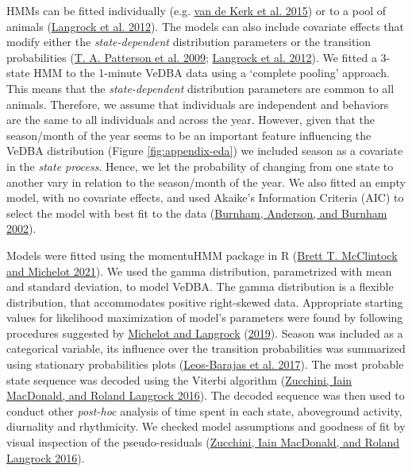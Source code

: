 \documentclass[english,msc,numbers,hidelinks]{coppe}
\begin{document}
  HMMs can be fitted individually (e.g. \protect\hyperlink{ref-vandekerk2015}{van de Kerk et al. 2015}) or to a pool of animals (\protect\hyperlink{ref-langrock2012}{Langrock et al. 2012}). The models can also include covariate effects that modify either the \emph{state-dependent} distribution parameters or the transition probabilities (\protect\hyperlink{ref-patterson2009}{T. A. Patterson et al. 2009}; \protect\hyperlink{ref-langrock2012}{Langrock et al. 2012}). We fitted a 3-state HMM to the 1-minute VeDBA data using a `complete pooling' approach. This means that the \emph{state-dependent} distribution parameters are common to all animals. Therefore, we assume that individuals are independent and behaviors are the same to all individuals and across the year. However, given that the season/month of the year seems to be an important feature influencing the VeDBA distribution (Figure \ref{fig:appendix-eda}) we included season as a covariate in the \emph{state process}. Hence, we let the probability of changing from one state to another vary in relation to the season/month of the year. We also fitted an empty model, with no covariate effects, and used Akaike's Information Criteria (AIC) to select the model with best fit to the data (\protect\hyperlink{ref-burnham2002}{Burnham, Anderson, and Burnham 2002}).

  Models were fitted using the momentuHMM package in R (\protect\hyperlink{ref-mcclintock2021}{Brett T. McClintock and Michelot 2021}). We used the gamma distribution, parametrized with mean and standard deviation, to model VeDBA. The gamma distribution is a flexible distribution, that accommodates positive right-skewed data. Appropriate starting values for likelihood maximization of model's parameters were found by following procedures suggested by \protect\hyperlink{ref-michelot2019}{Michelot and Langrock} (\protect\hyperlink{ref-michelot2019}{2019}). Season was included as a categorical variable, its influence over the transition probabilities was summarized using stationary probabilities plots (\protect\hyperlink{ref-leosbarajas2017}{Leos-Barajas et al. 2017}). The most probable state sequence was decoded using the Viterbi algorithm (\protect\hyperlink{ref-zucchini2016}{Zucchini, Iain MacDonald, and Roland Langrock 2016}). The decoded sequence was then used to conduct other \emph{post-hoc} analysis of time spent in each state, aboveground activity, diurnality and rhythmicity. We checked model assumptions and goodness of fit by visual inspection of the pseudo-residuals (\protect\hyperlink{ref-zucchini2016}{Zucchini, Iain MacDonald, and Roland Langrock 2016}).
\end{document}
